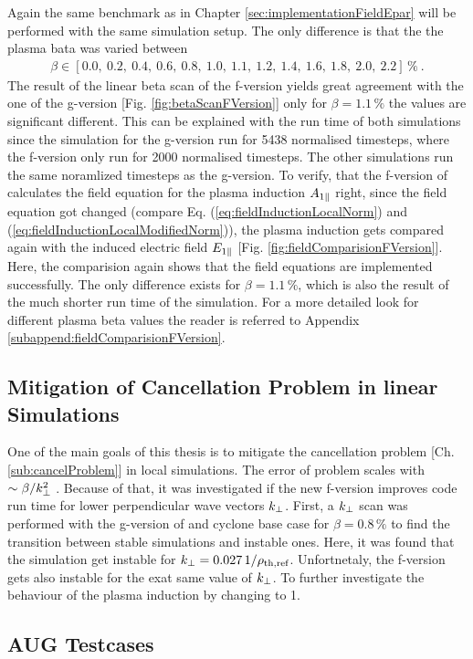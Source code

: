Again the same benchmark as in Chapter \ref{sec:implementationFieldEpar} will be performed with the same simulation setup. The only difference is that the the plasma bata was varied between
\begin{gather}
    \beta \in [0.0,~0.2,~0.4,~0.6,~0.8,~1.0,~1.1,~1.2,~1.4,~1.6,~1.8,~2.0,~2.2]\,\%~.
\end{gather}
The result of the linear beta scan of the f-version yields great agreement with the one of the g-version [Fig. \ref{fig:betaScanFVersion}] only for $\beta = 1.1\,\%$ the values are significant different. This can be explained with the run time of both simulations since the simulation for the g-version run for 5438 normalised timesteps, where the f-version only run for 2000 normalised timesteps. The other simulations run the same noramlized timesteps as the g-version. To verify, that the f-version of {\gkw} calculates the field equation for the plasma induction $A_{1\parallel}$ right, since the field equation got changed (compare Eq. (\ref{eq:fieldInductionLocalNorm}) and (\ref{eq:fieldInductionLocalModifiedNorm})), the plasma induction gets compared again with the induced electric field $E_{1\parallel}$ [Fig. \ref{fig:fieldComparisionFVersion}]. Here, the comparision again shows that the field equations are implemented successfully. The only difference exists for $\beta = 1.1\,\%$, which is also the result of the much shorter run time of the simulation. For a more detailed look for different plasma beta values the reader is referred to Appendix \ref{subappend:fieldComparisionFVersion}.




\subsection*{Mitigation of Cancellation Problem in linear Simulations}
\label{sub:mitigationLinearLocal}

One of the main goals of this thesis is to mitigate the cancellation problem [Ch. \ref{sub:cancelProblem}] in local simulations. The error of problem scales with $\sim \beta/k_\perp^2$ \cite{Mishchenko2017}. Because of that, it was investigated if the new f-version improves code run time for lower perpendicular wave vectors $k_\perp$. First, a $k_\perp$ scan was performed with the g-version of {\gkw} and cyclone base case for $\beta = 0.8\,\%$ to find the transition between stable simulations and instable ones. Here, it was found that the simulation get instable for $k_\perp = 0.027\,1/\rho_{\mathrm{th},\mathrm{ref}}$. Unfortnetaly, the f-version gets also instable for the exat same value of $k_\perp$. To further investigate the behaviour of the plasma induction by changing  to 1. 


\subsection*{AUG Testcases}
\label{sub:mitigationLinearLocal}

\newpage